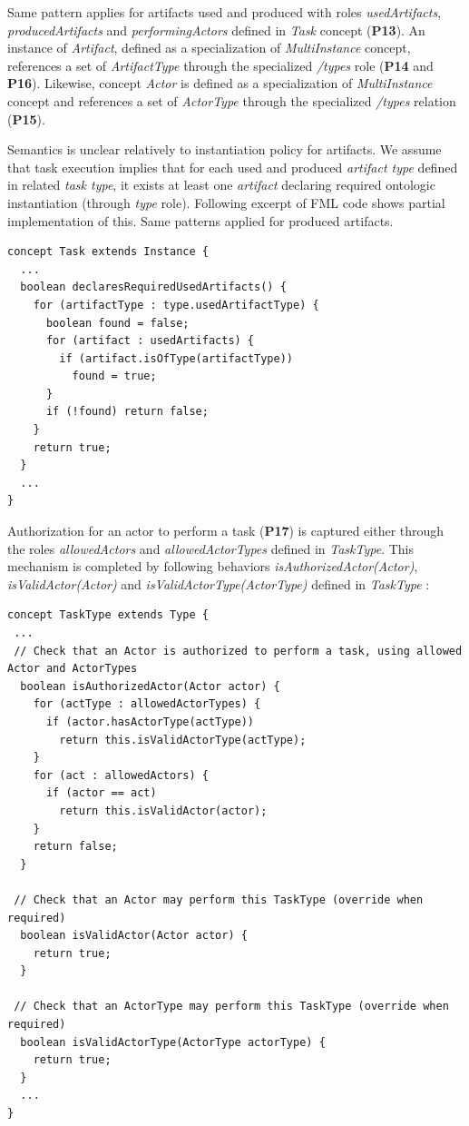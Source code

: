 Same pattern applies for artifacts used and produced with roles \textit{usedArtifacts}, \textit{producedArtifacts} and \textit{performingActors} defined in \textit{Task} concept (\textbf{P13}). An instance of \textit{Artifact}, defined as a specialization of \textit{MultiInstance} concept, references a set of \textit{ArtifactType} through the specialized \textit{/types} role (\textbf{P14} and \textbf{P16}). Likewise, concept \textit{Actor} is defined as a specialization of \textit{MultiInstance} concept and references a set of \textit{ActorType} through the specialized \textit{/types} relation (\textbf{P15}).

Semantics is unclear relatively to instantiation policy for artifacts. We assume that task execution implies that for each used and produced \textit{artifact type} defined in related \textit{task type}, it exists at least one \textit{artifact} declaring required ontologic instantiation (through \textit{type} role). Following excerpt of FML code shows partial implementation of this. Same patterns applied for produced artifacts.

\begin{lstlisting}
concept Task extends Instance {
  ...
  boolean declaresRequiredUsedArtifacts() {
    for (artifactType : type.usedArtifactType) {
      boolean found = false;
      for (artifact : usedArtifacts) {
        if (artifact.isOfType(artifactType))
          found = true;
      }
      if (!found) return false;
    }
    return true;
  }
  ...
}    
\end{lstlisting}

Authorization for an actor to perform a task (\textbf{P17}) is captured either through the roles \textit{allowedActors} and \textit{allowedActorTypes} defined in \textit{TaskType}. This mechanism is completed by following behaviors \textit{isAuthorizedActor(Actor)}, \textit{isValidActor(Actor)} and \textit{isValidActorType(ActorType)} defined in \textit{TaskType} : 

\begin{lstlisting}
concept TaskType extends Type {
 ...
 // Check that an Actor is authorized to perform a task, using allowed Actor and ActorTypes
  boolean isAuthorizedActor(Actor actor) {      
    for (actType : allowedActorTypes) {        
      if (actor.hasActorType(actType))         
        return this.isValidActorType(actType);          
    }        
    for (act : allowedActors) {        
      if (actor == act)         
        return this.isValidActor(actor);
    }
    return false;
  }
  
 // Check that an Actor may perform this TaskType (override when required)
  boolean isValidActor(Actor actor) {
    return true;
  }

 // Check that an ActorType may perform this TaskType (override when required)
  boolean isValidActorType(ActorType actorType) {
    return true;
  }
  ...
}
\end{lstlisting}

